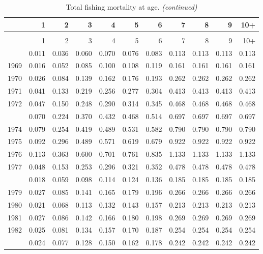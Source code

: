 \documentclass[
]{article}
\begin{document}
\begin{longtable}[t]{lrrrrrrrrrr}
\caption{\label{tab:FAA-tot-table}Total fishing mortality at age.}\\
\toprule
  & 1 & 2 & 3 & 4 & 5 & 6 & 7 & 8 & 9 & 10+\\
\midrule
\endfirsthead
\caption[]{Total fishing mortality at age. \textit{(continued)}}\\
\toprule
  & 1 & 2 & 3 & 4 & 5 & 6 & 7 & 8 & 9 & 10+\\
\midrule
\endhead

\endfoot
\bottomrule
\endlastfoot
1968 & 0.011 & 0.036 & 0.060 & 0.070 & 0.076 & 0.083 & 0.113 & 0.113 & 0.113 & 0.113\\
1969 & 0.016 & 0.052 & 0.085 & 0.100 & 0.108 & 0.119 & 0.161 & 0.161 & 0.161 & 0.161\\
1970 & 0.026 & 0.084 & 0.139 & 0.162 & 0.176 & 0.193 & 0.262 & 0.262 & 0.262 & 0.262\\
1971 & 0.041 & 0.133 & 0.219 & 0.256 & 0.277 & 0.304 & 0.413 & 0.413 & 0.413 & 0.413\\
1972 & 0.047 & 0.150 & 0.248 & 0.290 & 0.314 & 0.345 & 0.468 & 0.468 & 0.468 & 0.468\\
\addlinespace
1973 & 0.070 & 0.224 & 0.370 & 0.432 & 0.468 & 0.514 & 0.697 & 0.697 & 0.697 & 0.697\\
1974 & 0.079 & 0.254 & 0.419 & 0.489 & 0.531 & 0.582 & 0.790 & 0.790 & 0.790 & 0.790\\
1975 & 0.092 & 0.296 & 0.489 & 0.571 & 0.619 & 0.679 & 0.922 & 0.922 & 0.922 & 0.922\\
1976 & 0.113 & 0.363 & 0.600 & 0.701 & 0.761 & 0.835 & 1.133 & 1.133 & 1.133 & 1.133\\
1977 & 0.048 & 0.153 & 0.253 & 0.296 & 0.321 & 0.352 & 0.478 & 0.478 & 0.478 & 0.478\\
\addlinespace
1978 & 0.018 & 0.059 & 0.098 & 0.114 & 0.124 & 0.136 & 0.185 & 0.185 & 0.185 & 0.185\\
1979 & 0.027 & 0.085 & 0.141 & 0.165 & 0.179 & 0.196 & 0.266 & 0.266 & 0.266 & 0.266\\
1980 & 0.021 & 0.068 & 0.113 & 0.132 & 0.143 & 0.157 & 0.213 & 0.213 & 0.213 & 0.213\\
1981 & 0.027 & 0.086 & 0.142 & 0.166 & 0.180 & 0.198 & 0.269 & 0.269 & 0.269 & 0.269\\
1982 & 0.025 & 0.081 & 0.134 & 0.157 & 0.170 & 0.187 & 0.254 & 0.254 & 0.254 & 0.254\\
\addlinespace
1983 & 0.024 & 0.077 & 0.128 & 0.150 & 0.162 & 0.178 & 0.242 & 0.242 & 0.242 & 0.242\\

\end{longtable}
\end{document}
